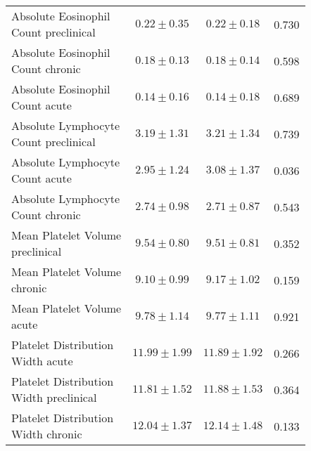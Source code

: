 \begin{table}[htbp]
\begin{tabular}{lccc}
\makecell[l]{Absolute Eosinophil \\ Count preclinical} & $0.22 \pm 0.35$ & $0.22 \pm 0.18$ & 0.730  \\

\makecell[l]{Absolute Eosinophil \\ Count chronic} & $0.18 \pm 0.13$ & $0.18 \pm 0.14$ & 0.598  \\

\makecell[l]{Absolute Eosinophil \\ Count acute} & $0.14 \pm 0.16$ & $0.14 \pm 0.18$ & 0.689  \\

\makecell[l]{Absolute Lymphocyte \\ Count preclinical} & $3.19 \pm 1.31$ & $3.21 \pm 1.34$ & 0.739  \\

\makecell[l]{Absolute Lymphocyte \\ Count acute} & $2.95 \pm 1.24$ & $3.08 \pm 1.37$ & 0.036  \\

\makecell[l]{Absolute Lymphocyte \\ Count chronic} & $2.74 \pm 0.98$ & $2.71 \pm 0.87$ & 0.543  \\

\makecell[l]{Mean Platelet Volume \\ preclinical} & $9.54 \pm 0.80$ & $9.51 \pm 0.81$ & 0.352  \\

\makecell[l]{Mean Platelet Volume \\ chronic} & $9.10 \pm 0.99$ & $9.17 \pm 1.02$ & 0.159  \\

\makecell[l]{Mean Platelet Volume \\ acute} & $9.78 \pm 1.14$ & $9.77 \pm 1.11$ & 0.921  \\

\makecell[l]{Platelet Distribution \\ Width acute} & $11.99 \pm 1.99$ & $11.89 \pm 1.92$ & 0.266  \\

\makecell[l]{Platelet Distribution \\ Width preclinical} & $11.81 \pm 1.52$ & $11.88 \pm 1.53$ & 0.364  \\

\makecell[l]{Platelet Distribution \\ Width chronic} & $12.04 \pm 1.37$ & $12.14 \pm 1.48$ & 0.133  \\


\end{tabular}
\end{table}
